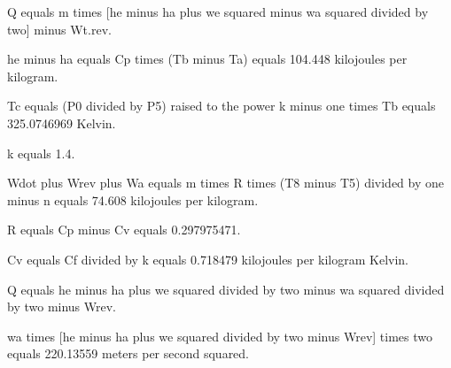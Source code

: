 Q equals m times [he minus ha plus we squared minus wa squared divided by two] minus Wt.rev.

he minus ha equals Cp times (Tb minus Ta) equals 104.448 kilojoules per kilogram.

Tc equals (P0 divided by P5) raised to the power k minus one times Tb equals 325.0746969 Kelvin.

k equals 1.4.

Wdot plus Wrev plus Wa equals m times R times (T8 minus T5) divided by one minus n equals 74.608 kilojoules per kilogram.

R equals Cp minus Cv equals 0.297975471.

Cv equals Cf divided by k equals 0.718479 kilojoules per kilogram Kelvin.

Q equals he minus ha plus we squared divided by two minus wa squared divided by two minus Wrev.

wa times [he minus ha plus we squared divided by two minus Wrev] times two equals 220.13559 meters per second squared.